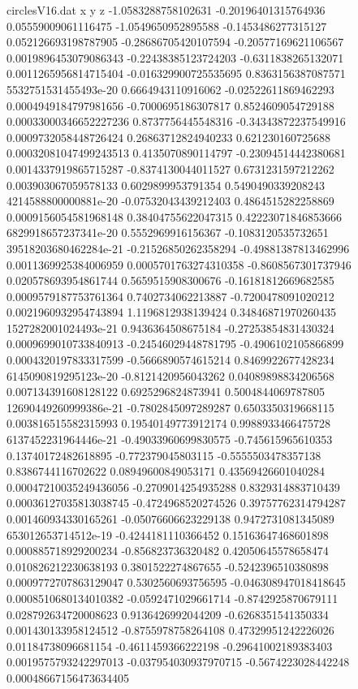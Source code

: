 \begin{filecontents}{circlesV16.dat}
x y z
-1.0583288758102631	-0.20196401315764936	0.05559009061116475
-1.0549650952895588	-0.1453486277315127	0.052126693198787905
-0.28686705420107594	-0.20577169621106567	0.0019896453079086343
-0.22438385123724203	-0.6311838265132071	0.0011265956814715404
-0.016329900725535695	0.8363156387087571	5532751531455493e-20
0.6664943110916062	-0.02522611869462293	0.0004949184797981656
-0.7000695186307817	0.8524609054729188	0.00033000346652227236
0.8737756445548316	-0.34343872237549916	0.0009732058448726424
0.26863712824940233	0.621230160725688	0.00032081047499243513
0.4135070890114797	-0.23094514442380681	0.0014337919865715287
-0.8374130044011527	0.6731231597212262	0.003903067059578133
0.6029899953791354	0.5490490339208243	4214588800000881e-20
-0.07532043439212403	0.4864515282258869	0.0009156054581968148
0.38404755622047315	0.42223071846853666	6829918657237341e-20
0.5552969916156367	-0.1083120535732651	39518203680462284e-21
-0.21526850262358294	-0.49881387813462996	0.0011369925384006959
0.0005701763274310358	-0.8608567301737946	0.020578693954861744
0.5659515908300676	-0.16181812669682585	0.0009579187753761364
0.7402734062213887	-0.7200478091020212	0.0021960932954743894
1.1196812938139424	0.34846871970260435	1527282001024493e-21
0.9436364508675184	-0.27253854831430324	0.0009699010733840913
-0.24546029448781795	-0.4906102105866899	0.0004320197833317599
-0.5666890574615214	0.8469922677428234	6145090819295123e-20
-0.8121420956043262	0.04089898834206568	0.007134391608128122
0.6925296824873941	0.5004844069787805	12690449260999386e-21
-0.7802845097289287	0.6503350319668115	0.003816515582315993
0.19540149773912174	0.9988933466475728	6137452231964446e-21
-0.49033960699830575	-0.745615965610353	0.13740172482618895
-0.772379045803115	-0.5555503478357138	0.8386744116702622
0.08949600849053171	0.43569426601040284	0.00047210035249436056
-0.2709014254935288	0.8329314883710439	0.00036127035813038745
-0.4724968520274526	0.39757762314794287	0.001460934330165261
-0.05076606623229138	0.9472731081345089	653012653714512e-19
-0.4244181110366452	0.15163647468601898	0.000885718929200234
-0.856823736320482	0.42050645578658474	0.010826212230638193
0.3801522274867655	-0.5242396510380898	0.0009772707863129047
0.5302560693756595	-0.046308947018418645	0.0008510680134010382
-0.0592471029661714	-0.8742925870679111	0.028792634720008623
0.9136426992044209	-0.6268351541350334	0.001430133958124512
-0.8755978758264108	0.47329951242226026	0.01184738096681154
-0.4611459366222198	-0.29641002189383403	0.0019575793242297013
-0.037954030937970715	-0.5674223028442248	0.00048667156473634405

\end{filecontents}
